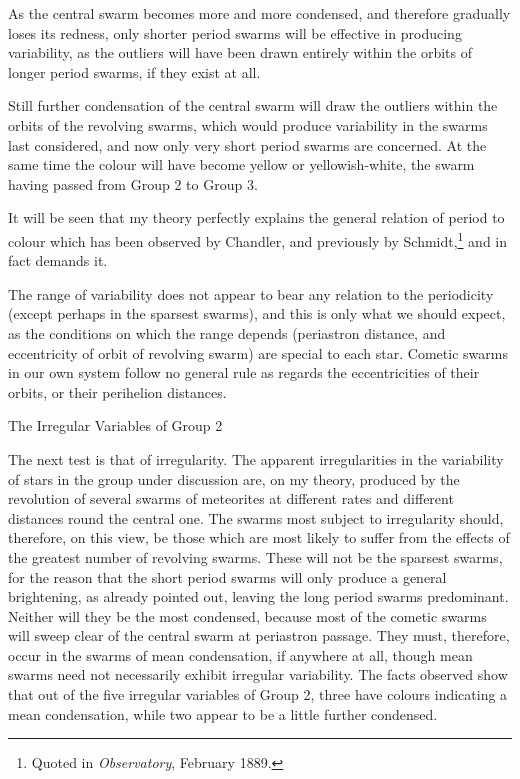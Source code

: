 \documentclass[a4paper, 12pt, oneside, polutonikogreek, english]{article}
\begin{document}
As the central swarm becomes more and more condensed, and therefore gradually loses its redness, only shorter period swarms will be effective in producing variability, as the outliers will have been drawn entirely within the orbits of longer period swarms, if they exist at all.

Still further condensation of the central swarm will draw the outliers within the orbits of the revolving swarms, which would produce variability in the swarms last considered, and now only very short period swarms are concerned. At the same time the colour will have become yellow or yellowish-white, the swarm having passed from Group 2 to Group 3.

It will be seen that my theory perfectly explains the general relation of period to colour which has been observed by Chandler, and previously by Schmidt,\footnote{Quoted in \emph{Observatory}, February 1889.} and in fact demands it.

The range of variability does not appear to bear any relation to the periodicity (except perhaps in the sparsest swarms), and this is only what we should expect, as the conditions on which the range depends (periastron distance, and eccentricity of orbit of revolving swarm) are special to each star. Cometic swarms in our own system follow no general rule as regards the eccentricities of their orbits, or their perihelion distances.

The Irregular Variables of Group 2

The next test is that of irregularity. The apparent irregularities in the variability of stars in the group under discussion are, on my theory, produced by the revolution of several swarms of meteorites at different rates and different distances round the central one. The swarms most subject to irregularity should, therefore, on this view, be those which are most likely to suffer from the effects of the greatest number of revolving swarms. These will not be the sparsest swarms, for the reason that the short period swarms will only produce a general brightening, as already pointed out, leaving the long period swarms predominant. Neither will they be the most condensed, because most of the cometic swarms will sweep clear of the central swarm at periastron passage. They must, therefore, occur in the swarms of mean condensation, if anywhere at all, though mean swarms need not necessarily exhibit irregular variability. The facts observed show that out of the five irregular variables of Group 2, three have colours indicating a mean condensation, while two appear to be a little further condensed.
\end{document}

